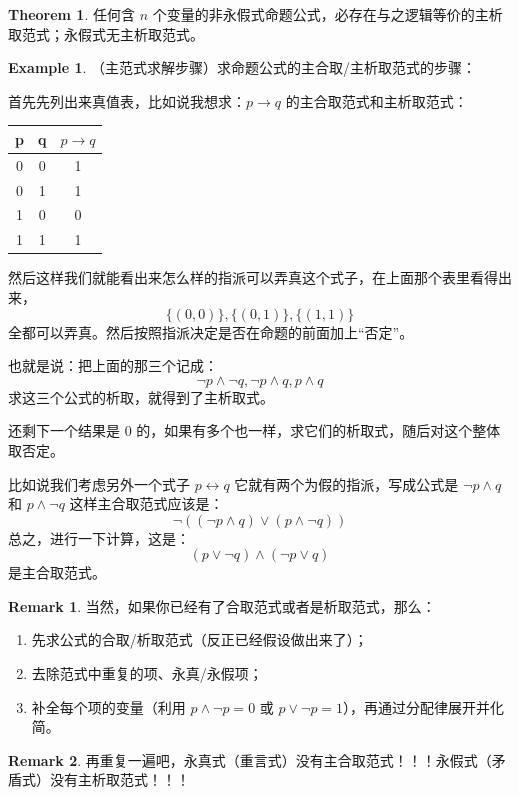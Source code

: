 \documentclass[oneside]{book}
\theoremstyle{definition}
\newtheorem{example}{Example}[section]
\newtheorem{theorem}{Theorem}[section]
\newtheorem{remark}{Remark}[section]
\begin{document}
\begin{theorem}
	任何含 \( n \) 个变量的非永假式命题公式，必存在与之逻辑等价的主析取范式；永假式无主析取范式。
\end{theorem}

\begin{example}
	（主范式求解步骤）求命题公式的主合取/主析取范式的步骤：
	
	首先先列出来真值表，比如说我想求：\(p\to q\) 的主合取范式和主析取范式：
	\begin{center}
		\begin{tabular}{|c|c|c|}
			\hline
			p & q & \(p\to q\) \\
			\hline
			0 & 0 & 1  \\
			0 & 1 & 1 \\
			1 & 0 & 0  \\
			1 & 1 & 1 \\
			\hline
		\end{tabular}
	\end{center}
 然后这样我们就能看出来怎么样的指派可以弄真这个式子，在上面那个表里看得出来，\[\{(0,0)\},\{(0,1)\},\{(1,1)\}\] 全都可以弄真。然后按照指派决定是否在命题的前面加上“否定”。
 
 也就是说：把上面的那三个记成：
 \[\neg p\land \neg q,\neg p\land  q, p\land  q\]
 	求这三个公式的析取，就得到了主析取式。
 	
 	还剩下一个结果是 0 的，如果有多个也一样，求它们的析取式，随后对这个整体取否定。
 	
 	比如说我们考虑另外一个式子 \(p\leftrightarrow q\) 它就有两个为假的指派，写成公式是 \(\neg p \land q\) 和 \( p\land \neg q\) 这样主合取范式应该是：
 	\[\neg((\neg p \land q)\lor (p\land \neg q))\]
 	总之，进行一下计算，这是：
 	\[(p\lor \neg q)\land(\neg p \lor q)\]
 	是主合取范式。
\end{example}


\begin{remark}
	当然，如果你已经有了合取范式或者是析取范式，那么：
	\begin{enumerate}
		\item 先求公式的合取/析取范式（反正已经假设做出来了）；
		\item 去除范式中重复的项、永真/永假项；
		\item 补全每个项的变量（利用 \( p \land \lnot p = 0 \) 或 \( p \lor \lnot p = 1 \)），再通过分配律展开并化简。
	\end{enumerate}
\end{remark}
\begin{remark}
	再重复一遍吧，永真式（重言式）没有主合取范式！！！永假式（矛盾式）没有主析取范式！！！
\end{remark}
\end{document}
